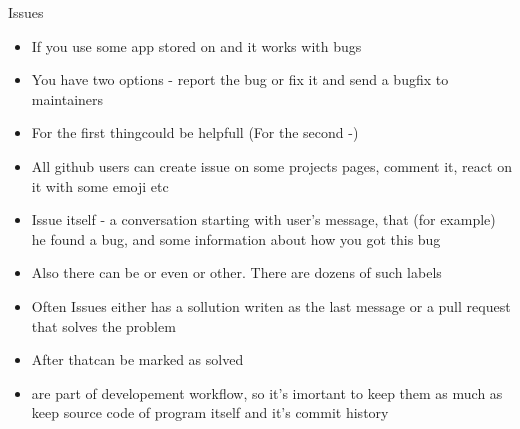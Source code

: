 \documentclass[usenames,dvipsnames,10pt,aspectratio=169]{beamer}
\begin{document}
\begin{frame}{Issues}
    \begin{itemize}
        \item If you use some app stored on  and it works with bugs
        \item You have two options - report the bug or fix it and send a bugfix to maintainers
        \item For the first thingcould be helpfull (For the second -)
        \item All github users can create issue on some projects pages, comment it, react on it with some emoji etc
        \item Issue itself - a conversation starting with user's message, that (for example) he found a bug, and some information about how you got this bug
        \item Also there can be  or even  or other. There are dozens of such labels
        \item Often Issues either has a sollution writen as the last message or a pull request that solves the problem
        \item After thatcan be marked as solved
        \item {} are part of developement workflow, so it's imortant to keep them as much as keep source code of program itself and it's commit history
    \end{itemize}
\end{frame}

\end{document}
